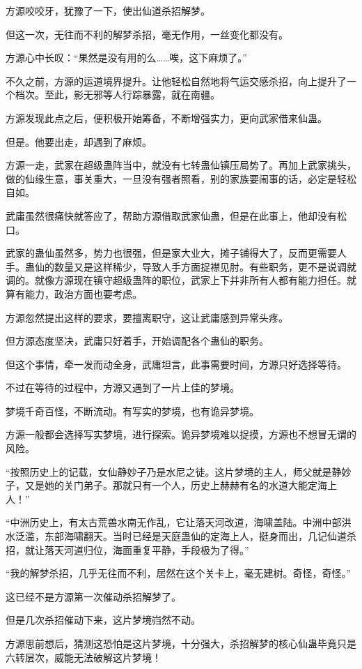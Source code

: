 \begin{this_body}
方源咬咬牙，犹豫了一下，使出仙道杀招解梦。

但这一次，无往而不利的解梦杀招，毫无作用，一丝变化都没有。

方源心中长叹：“果然是没有用的么……唉，这下麻烦了。”

不久之前，方源的运道境界提升。让他轻松自然地将气运交感杀招，向上提升了一个档次。至此，影无邪等人行踪暴露，就在南疆。

方源发现此点之后，便积极开始筹备，不断增强实力，更向武家借来仙蛊。

但是。他要出走，却遇到了麻烦。

方源一走，武家在超级蛊阵当中，就没有七转蛊仙镇压局势了。再加上武家挑头，做的仙缘生意，事关重大，一旦没有强者照看，别的家族要闹事的话，必定是轻松自如。

武庸虽然很痛快就答应了，帮助方源借取武家仙蛊，但是在此事上，他却没有松口。

武家的蛊仙虽然多，势力也很强，但是家大业大，摊子铺得大了，反而更需要人手。蛊仙的数量又是这样稀少，导致人手方面捉襟见肘。有些职务，更不是说调就调的。就像方源现在镇守超级蛊阵的职位，武家上下并非所有人都有能力担任。就算有能力，政治方面也要考虑。

方源忽然提出这样的要求，要擅离职守，这让武庸感到异常头疼。

但方源态度坚决，武庸只好着手，开始调配各个蛊仙的职务。

但这个事情，牵一发而动全身，武庸坦言，此事需要时间，方源只好选择等待。

不过在等待的过程中，方源又遇到了一片上佳的梦境。

梦境千奇百怪，不断流动。有写实的梦境，也有诡异梦境。

方源一般都会选择写实梦境，进行探索。诡异梦境难以捉摸，方源也不想冒无谓的风险。

“按照历史上的记载，女仙静妙子乃是水尼之徒。这片梦境的主人，师父就是静妙子，又是她的关门弟子。那就只有一个人，历史上赫赫有名的水道大能定海上人！”

“中洲历史上，有太古荒兽水南无作乱，它让落天河改道，海啸盖陆。中洲中部洪水泛滥，东部海啸翻天。当时已经是天庭蛊仙的定海上人，挺身而出，几记仙道杀招，就让落天河道归位，海面重复平静，手段极为了得。”

“我的解梦杀招，几乎无往而不利，居然在这个关卡上，毫无建树。奇怪，奇怪。”

这已经不是方源第一次催动杀招解梦了。

但是几次杀招催动下来，这片梦境岿然不动。

方源思前想后，猜测这恐怕是这片梦境，十分强大，杀招解梦的核心仙蛊毕竟只是六转层次，威能无法破解这片梦境！


\end{this_body}
